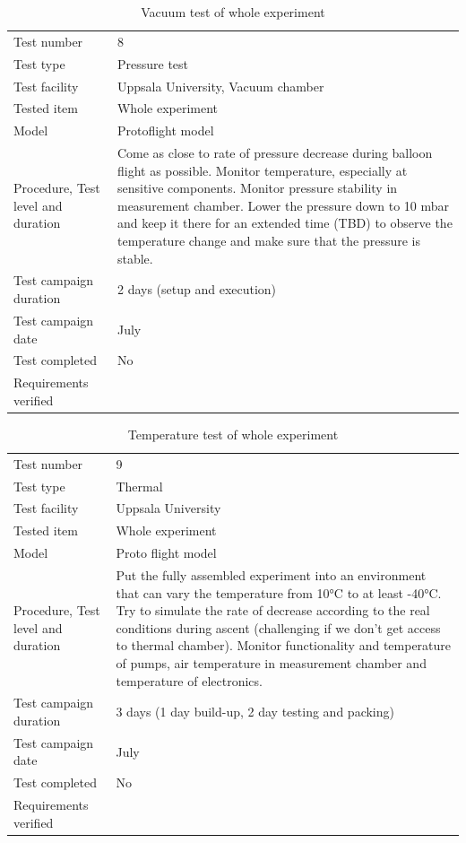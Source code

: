 \begin{table}[H]
\centering
\caption{Vacuum test of whole experiment}
\label{tab:vacuum_test}
\begin{tabular}{L{5cm}L{10cm}}
\toprule
Test number & 8  \\
Test type & Pressure test \\
Test facility & Uppsala University, Vacuum chamber \\
Tested item & Whole experiment \\
Model & Protoflight model \\
Procedure, Test level and duration & Come as close to rate of pressure decrease during balloon flight as possible. Monitor temperature, especially at sensitive components. Monitor pressure stability in measurement chamber. Lower the pressure down to 10 mbar and keep it there for an extended time (TBD) to observe the temperature change and make sure that the pressure is stable. \\
Test campaign duration & 2 days (setup and execution) \\
Test campaign date & July \\
Test completed & No \\
Requirements verified & \\
\bottomrule
\end{tabular}
\end{table}


\begin{table}[H]
\centering
\caption{Temperature test of whole experiment}
\label{tab:test_temperature}
\begin{tabular}{L{5cm}L{10cm}}
\toprule
Test number & 9 \\
Test type & Thermal \\
Test facility & Uppsala University \\
Tested item & Whole experiment \\
Model & Proto flight model \\
Procedure, Test level and duration & Put the fully assembled experiment into an environment that can vary the temperature from 10°C to at least -40°C. Try to simulate the rate of decrease according to the real conditions during ascent (challenging if we don’t get access to thermal chamber). Monitor functionality and temperature of pumps, air temperature in measurement chamber and temperature of electronics. \\
Test campaign duration & 3 days (1 day build-up, 2 day testing and packing) \\
Test campaign date & July \\
Test completed & No \\
Requirements verified & \\
\bottomrule
\end{tabular}
\end{table}


